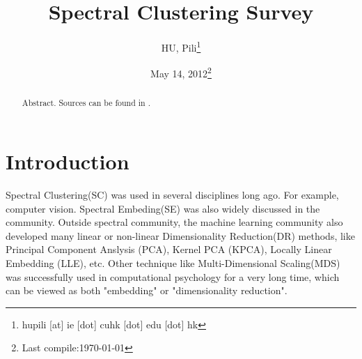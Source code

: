 

\usepackage{algorithm}
\usepackage{algorithmic}
\renewcommand{\algorithmicrequire}{\textbf{Input:}}
\renewcommand{\algorithmicensure}{\textbf{Output:}}

\newcommand{\nL}{\mathcal{L}}
\newcommand{\nA}{\mathcal{A}}
\newcommand{\sym}[1]{#1_{\text{sym}}}
\newcommand{\rw}[1]{#1_{\text{rw}}}
\newcommand{\cut}[1]{\text{cut}(#1)}
\newcommand{\assoc}[1]{\text{assoc}(#1)}
\newcommand{\vol}[1]{\text{vol}(#1)}


\usepackage{subfigure}


\author{HU, Pili\thanks{hupili [at] ie [dot] cuhk [dot] edu [dot] hk}}

\title{Spectral Clustering Survey}
\date{May 14, 2012\thanks{Last compile:\today}}



\maketitle
\begin{abstract}
	Abstract. Sources can be found in \cite{hu2012-spectral2hop}. 
\end{abstract}

\pagebreak
\setcounter{tocdepth}{3}
\tableofcontents
\pagebreak



\section{Introduction}
\label{sec:introduction}

Spectral Clustering(SC) was used in several disciplines long ago. 
For example, computer vision\cite{shi2000normalized}.
Spectral Embeding(SE) was 
also widely discussed in the community\cite{brand2003unifying}. 
Outside spectral community, the machine learning community also 
developed many linear or non-linear Dimensionality Reduction(DR) methods, 
like Principal Component Anslysis (PCA), Kernel PCA (KPCA)\cite{scholkopf1998kpca}, 
Locally Linear Embedding (LLE)\cite{roweis2000lle}, etc. 
Other technique like Multi-Dimensional Scaling(MDS) was successfully 
used in computational psychology for a very long time\cite{borg2005modern}, 
which can be viewed as both "embedding" or "dimensionality reduction".

